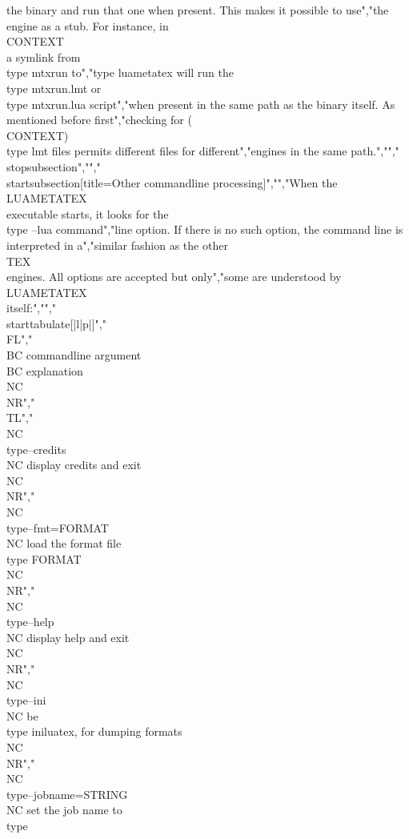 the binary and run that one when present. This makes it possible to use","the engine as a stub. For instance, in \\CONTEXT\\ a symlink from \\type {mtxrun} to","type {luametatex} will run the \\type {mtxrun.lmt} or \\type {mtxrun.lua} script","when present in the same path as the binary itself. As mentioned before first","checking for (\\CONTEXT) \\type {lmt} files permits different files for different","engines in the same path.","","\\stopsubsection","","\\startsubsection[title={Other commandline processing}]","","When the \\LUAMETATEX\\ executable starts, it looks for the \\type {--lua} command","line option. If there is no such option, the command line is interpreted in a","similar fashion as the other \\TEX\\ engines. All options are accepted but only","some are understood by \\LUAMETATEX\\ itself:","","\\starttabulate[|l|p|]","\\FL","\\BC commandline argument    \\BC explanation \\NC \\NR","\\TL","\\NC \\type{--credits}        \\NC display credits and exit \\NC \\NR","\\NC \\type{--fmt=FORMAT}     \\NC load the format file \\type {FORMAT} \\NC\\NR","\\NC \\type{--help}           \\NC display help and exit \\NC\\NR","\\NC \\type{--ini}            \\NC be \\type {iniluatex}, for dumping formats \\NC\\NR","\\NC \\type{--jobname=STRING} \\NC set the job name to \\type 